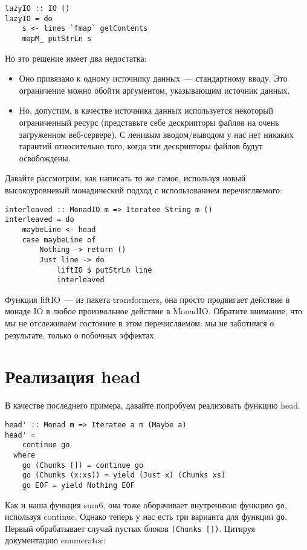 \begin{lstlisting}
lazyIO :: IO ()
lazyIO = do
    s <- lines `fmap` getContents
    mapM_ putStrLn s
\end{lstlisting}

Но это решение имеет два недостатка:

\begin{itemize}
\item Оно привязано к одному источнику данных~--- стандартному вводу. Это ограничение можно обойти аргументом, указывающим источник данных.
\item Но, допустим, в качестве источника данных используется некоторый ограниченный ресурс (представьте себе дескрипторы файлов на очень загруженном веб-сервере). С ленивым вводом/выводом у нас нет никаких гарантий относительно того, когда эти дескрипторы файлов будут освобождены.
\end{itemize}

Давайте рассмотрим, как написать то же самое, используя новый высокоуровневый монадический подход с использованием перечисляемого:

\begin{lstlisting}
interleaved :: MonadIO m => Iteratee String m ()
interleaved = do
    maybeLine <- head
    case maybeLine of
        Nothing -> return ()
        Just line -> do
            liftIO $ putStrLn line
            interleaved
\end{lstlisting}%

Функция liftIO~--- из пакета transformers, она просто продвигает действие в монаде IO в любое произвольное действие в MonadIO. Обратите внимание, что мы не отслеживаем состояние в этом перечисляемом: мы не заботимся о результате, только о побочных эффектах.

\section{Реализация head}

В качестве последнего примера, давайте попробуем реализовать функцию head.

\begin{lstlisting}
head' :: Monad m => Iteratee a m (Maybe a)
head' =
    continue go
  where
    go (Chunks []) = continue go
    go (Chunks (x:xs)) = yield (Just x) (Chunks xs)
    go EOF = yield Nothing EOF
\end{lstlisting}

Как и наша функция sum6, она тоже оборачивает внутреннюю функцию \lstinline'go', используя continue. Однако теперь у нас есть три варианта для функции \lstinline'go'. Первый обрабатывает случай пустых блоков \lstinline'(Chunks [])'. Цитируя документацию enumerator:


